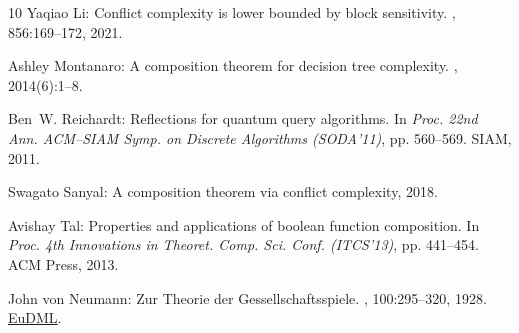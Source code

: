 \documentclass[11pt]{article}
\numberwithin{equation}{section}
\theoremstyle{definition}
\theoremstyle{plain}
\begin{document}
\begin{thebibliography}{10}
{\sc Yaqiao Li}: Conflict complexity is lower bounded by block sensitivity.
, 856:169--172, 2021.

{\sc Ashley Montanaro}: A composition theorem for decision tree complexity.
, 2014(6):1--8.

{\sc Ben~W. Reichardt}: Reflections for quantum query algorithms.
\newblock In {\em Proc. 22nd Ann. ACM--SIAM Symp. on Discrete Algorithms
  (SODA'11)}, pp. 560--569. SIAM, 2011.

{\sc Swagato Sanyal}: A composition theorem via conflict complexity, 2018.

{\sc Avishay Tal}: Properties and applications of boolean function composition.
\newblock In {\em Proc. 4th Innovations in Theoret. Comp. Sci. Conf.
  (ITCS'13)}, pp. 441--454. ACM Press, 2013.

{\sc John {von Neumann}}: {Zur Theorie der Gessellschaftsspiele}.
, 100:295--320, 1928.
\newblock \href{http://eudml.org/doc/159291}{EuDML}.

\end{thebibliography}
\end{document}
